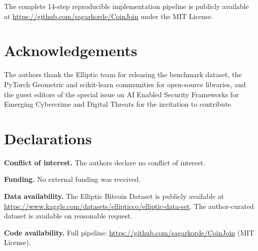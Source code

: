 \documentclass[12pt,a4paper]{article}
\begin{document}
The complete 14-step reproducible implementation pipeline
is publicly available at
\url{https://github.com/sagarkorde/CoinJoin}
under the MIT License.

\section*{Acknowledgements}
The authors thank the Elliptic team for releasing the
benchmark dataset, the PyTorch Geometric and scikit-learn
communities for open-source libraries, and the guest
editors of the special issue on AI Enabled Security
Frameworks for Emerging Cybercrime and Digital Threats
for the invitation to contribute.

\section*{Declarations}
\noindent\textbf{Conflict of interest.}
The authors declare no conflict of interest.

\noindent\textbf{Funding.}
No external funding was received.

\noindent\textbf{Data availability.}
The Elliptic Bitcoin Dataset is publicly available at
\url{https://www.kaggle.com/datasets/ellipticco/elliptic-data-set}.
The author-curated dataset is available on reasonable request.

\noindent\textbf{Code availability.}
Full pipeline: \url{https://github.com/sagarkorde/CoinJoin}
(MIT License).
\end{document}
